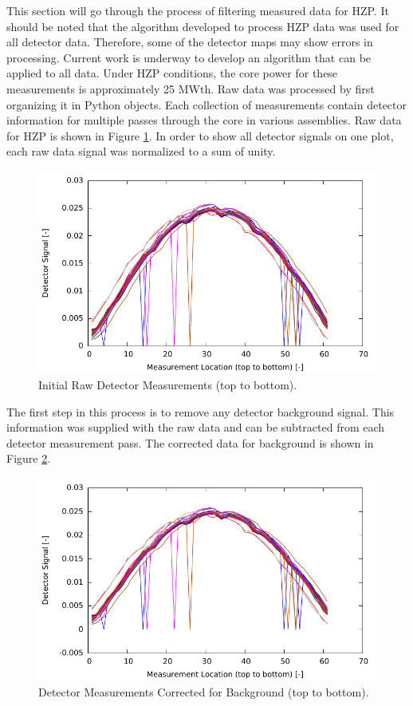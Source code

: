 This section will go through the process of filtering measured data for
\ac{HZP}.  It should be noted that the algorithm developed to process \ac{HZP}
data was used for all detector data. Therefore, some of the detector maps may
show errors in processing. Current work is underway to develop an algorithm
that can be applied to all data. Under \ac{HZP} conditions, the core power for
these measurements is approximately 25 MWth.  Raw data was processed by first
organizing it in Python objects. Each collection of measurements contain
detector information for multiple passes through the core in various assemblies.
Raw data for \ac{HZP} is shown in Figure \ref{fig:orig_all}. In order to show
all detector signals on one plot, each raw data signal was normalized to a sum
of unity.
\begin{figure}
    \centering
    \includegraphics{expdata/figs/original_all.pdf}
    \caption{Initial Raw Detector Measurements (top to bottom). \label{fig:orig_all}}
\end{figure}

The first step in this process is to remove any detector background signal. This 
information was supplied with the raw data and can be subtracted from each 
detector measurement pass. The corrected data for background is shown in Figure 
\ref{fig:back_all}.
\begin{figure}
    \centering
    \includegraphics{expdata/figs/background_all.pdf}
    \caption{Detector Measurements Corrected for Background (top to bottom). \label{fig:back_all}}
\end{figure}

